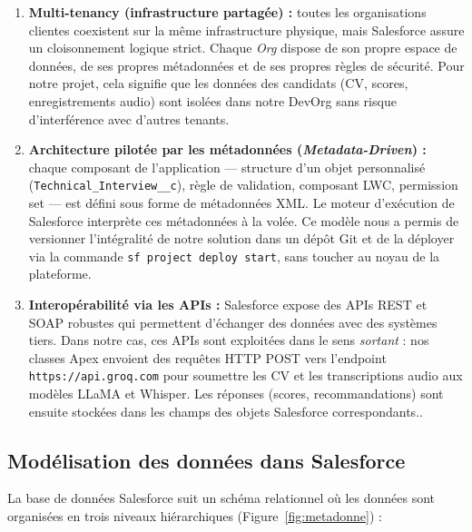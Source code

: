 \begin{enumerate}
    \item \textbf{Multi-tenancy (infrastructure partagée) :} toutes les organisations clientes coexistent sur la même infrastructure physique, mais Salesforce assure un cloisonnement logique strict. Chaque \textit{Org} dispose de son propre espace de données, de ses propres métadonnées et de ses propres règles de sécurité. Pour notre projet, cela signifie que les données des candidats (CV, scores, enregistrements audio) sont isolées dans notre DevOrg sans risque d'interférence avec d'autres tenants.
    
    \item \textbf{Architecture pilotée par les métadonnées (\textit{Metadata-Driven}) :} chaque composant de l'application --- structure d'un objet personnalisé (\texttt{Technical\_Interview\_\_c}), règle de validation, composant LWC, permission set --- est défini sous forme de métadonnées XML. Le moteur d'exécution de Salesforce interprète ces métadonnées à la volée. Ce modèle nous a permis de versionner l'intégralité de notre solution dans un dépôt Git et de la déployer via la commande \texttt{sf project deploy start}, sans toucher au noyau de la plateforme.
    
    \item \textbf{Interopérabilité via les APIs :} Salesforce expose des APIs REST et SOAP robustes qui permettent d'échanger des données avec des systèmes tiers. Dans notre cas, ces APIs sont exploitées dans le sens \textit{sortant} : nos classes Apex envoient des requêtes HTTP POST vers l'endpoint \texttt{https://api.groq.com} pour soumettre les CV et les transcriptions audio aux modèles LLaMA et Whisper. Les réponses (scores, recommandations) sont ensuite stockées dans les champs des objets Salesforce correspondants.\parencite{URL12}.
\end{enumerate}

\subsection{Modélisation des données dans Salesforce}

La base de données Salesforce suit un schéma relationnel où les données sont organisées en trois niveaux hiérarchiques (Figure~\ref{fig:metadonne}) :

